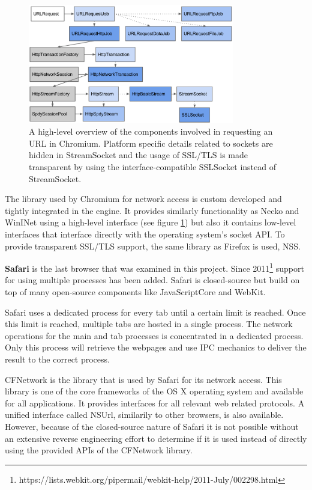 \begin{figure}[h]
    \centering
    \includegraphics[width=9cm]{Images/Chrome_network.png}
    \caption{A high-level overview of the components involved in requesting an URL in Chromium. Platform specific details related to sockets are hidden in StreamSocket and the usage of SSL/TLS is made transparent by using the interface-compatible SSLSocket instead of StreamSocket. \cite{ChromeNetwork}}
    \label{fig:chrome_network}
\end{figure}

The library used by Chromium for network access is custom developed and tightly integrated in the engine. It provides similarly functionality as Necko and WinINet using a high-level interface (see figure \ref{fig:chrome_network}) but also it contains low-level interfaces that interface directly with the operating system's socket API. To provide transparent SSL/TLS support, the same library as Firefox is used, NSS.

\textbf{Safari} is the last browser that was examined in this project. Since 2011\footnote{https://lists.webkit.org/pipermail/webkit-help/2011-July/002298.html} support for using multiple processes has been added. Safari is closed-source but build on top of many open-source components like JavaScriptCore and WebKit.

Safari uses a dedicated process for every tab until a certain limit is reached. Once this limit is reached, multiple tabs are hosted in a single process. The network operations for the main and tab processes is concentrated in a dedicated process. Only this process will retrieve the webpages and use IPC mechanics to deliver the result to the correct process. 

CFNetwork is the library that is used by Safari for its network access. This library is one of the core frameworks of the OS X operating system and available for all applications. It provides interfaces for all relevant web related protocols. A unified interface called NSUrl, similarily to other browsers, is also available. However, because of the closed-source nature of Safari it is not possible without an extensive reverse engineering effort to determine if it is used instead of directly using the provided APIs of the CFNetwork library.

